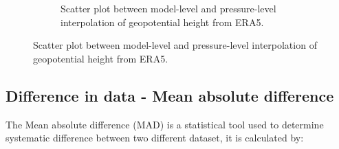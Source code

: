 \begin{figure}
\begin{subfigure}[h]{0.45\textwidth}
    \caption{Scatter plot between model-level and pressure-level interpolation of geopotential height from ERA5.}
    \label{fig:mlvsplgeopot}
    \end{subfigure}
\end{figure}

\subsection{Difference in data - Mean absolute difference}\label{sec:mad}
The Mean absolute difference (MAD) is a statistical tool used to determine systematic difference between two different dataset, it is calculated by:
